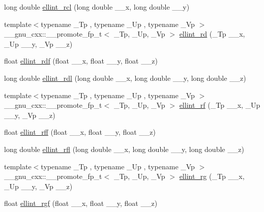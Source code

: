\begin{DoxyCompactItemize}
long double \hyperlink{group__gnu__math__spec__func_ga9b2f1cdeacd3615c702a77d995a0129c}{ellint\+\_\+rcl} (long double \+\_\+\+\_\+x, long double \+\_\+\+\_\+y)
\item 
{\footnotesize template$<$typename \+\_\+\+Tp , typename \+\_\+\+Up , typename \+\_\+\+Vp $>$ }\\\+\_\+\+\_\+gnu\+\_\+cxx\+::\+\_\+\+\_\+promote\+\_\+fp\+\_\+t$<$ \+\_\+\+Tp, \+\_\+\+Up, \+\_\+\+Vp $>$ \hyperlink{group__gnu__math__spec__func_ga6467a19028332392df825e232a97139f}{ellint\+\_\+rd} (\+\_\+\+Tp \+\_\+\+\_\+x, \+\_\+\+Up \+\_\+\+\_\+y, \+\_\+\+Vp \+\_\+\+\_\+z)
\item 
float \hyperlink{group__gnu__math__spec__func_ga52e7cc797b9d199b7468cdbec6505357}{ellint\+\_\+rdf} (float \+\_\+\+\_\+x, float \+\_\+\+\_\+y, float \+\_\+\+\_\+z)
\item 
long double \hyperlink{group__gnu__math__spec__func_ga68a38a5f320a7184cec4b120ddef6a65}{ellint\+\_\+rdl} (long double \+\_\+\+\_\+x, long double \+\_\+\+\_\+y, long double \+\_\+\+\_\+z)
\item 
{\footnotesize template$<$typename \+\_\+\+Tp , typename \+\_\+\+Up , typename \+\_\+\+Vp $>$ }\\\+\_\+\+\_\+gnu\+\_\+cxx\+::\+\_\+\+\_\+promote\+\_\+fp\+\_\+t$<$ \+\_\+\+Tp, \+\_\+\+Up, \+\_\+\+Vp $>$ \hyperlink{group__gnu__math__spec__func_ga9242fbc43bd340e0def2a6f15b755c1c}{ellint\+\_\+rf} (\+\_\+\+Tp \+\_\+\+\_\+x, \+\_\+\+Up \+\_\+\+\_\+y, \+\_\+\+Vp \+\_\+\+\_\+z)
\item 
float \hyperlink{group__gnu__math__spec__func_ga39acf5c69a85f9b687478b32847156da}{ellint\+\_\+rff} (float \+\_\+\+\_\+x, float \+\_\+\+\_\+y, float \+\_\+\+\_\+z)
\item 
long double \hyperlink{group__gnu__math__spec__func_ga38dd36b3db5bbe5da516d0cbe3ff1f21}{ellint\+\_\+rfl} (long double \+\_\+\+\_\+x, long double \+\_\+\+\_\+y, long double \+\_\+\+\_\+z)
\item 
{\footnotesize template$<$typename \+\_\+\+Tp , typename \+\_\+\+Up , typename \+\_\+\+Vp $>$ }\\\+\_\+\+\_\+gnu\+\_\+cxx\+::\+\_\+\+\_\+promote\+\_\+fp\+\_\+t$<$ \+\_\+\+Tp, \+\_\+\+Up, \+\_\+\+Vp $>$ \hyperlink{group__gnu__math__spec__func_gab525116e1b311da90e2745366ac314eb}{ellint\+\_\+rg} (\+\_\+\+Tp \+\_\+\+\_\+x, \+\_\+\+Up \+\_\+\+\_\+y, \+\_\+\+Vp \+\_\+\+\_\+z)
\item 
float \hyperlink{group__gnu__math__spec__func_ga7a4ab348bf312a3425501ac8a3d16494}{ellint\+\_\+rgf} (float \+\_\+\+\_\+x, float \+\_\+\+\_\+y, float \+\_\+\+\_\+z)

\end{DoxyCompactItemize}
